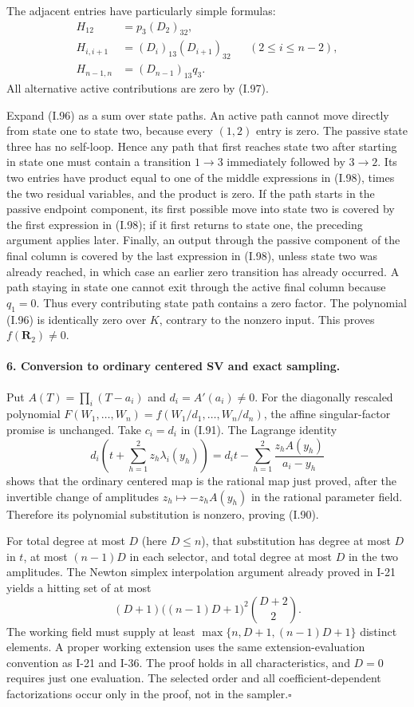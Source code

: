 The adjacent entries have particularly simple formulas:
\[
 \begin{aligned}
 H_{12}&=p_3(D_2)_{32},\\
 H_{i,i+1}&=(D_i)_{13}(D_{i+1})_{32}
                 &&(2\le i\le n-2),\\
 H_{n-1,n}&=(D_{n-1})_{13}q_3.
 \end{aligned}
 \tag{I.98}
\]
All alternative active contributions are zero by (I.97).

Expand (I.96) as a sum over state paths. An active path cannot
move directly from state one to state two, because every
$(1,2)$ entry is zero. The passive state three has no self-loop.
Hence any path that first reaches state two after starting in
state one must contain a transition $1\to3$ immediately
followed by $3\to2$. Its two entries have product equal to
one of the middle expressions in (I.98), times the two residual
variables, and the product is zero. If the path starts in the
passive endpoint component, its first possible move into state
two is covered by the first expression in (I.98); if it first
returns to state one, the preceding argument applies later.
Finally, an output through the passive component of the final
column is covered by the last expression in (I.98), unless
state two was already reached, in which case an earlier zero
transition has already occurred. A path staying in state one
cannot exit through the active final column because $q_1=0$.
Thus every contributing state path contains a zero factor.
The polynomial (I.96) is identically zero over $K$, contrary
to the nonzero input. This proves $f(\mathbf R_2)\ne0$.

\paragraph{6. Conversion to ordinary centered SV and exact sampling.}
Put $A(T)=\prod_i(T-a_i)$ and $d_i=A'(a_i)\ne0$. For the
diagonally rescaled polynomial
$F(W_1,\ldots,W_n)=f(W_1/d_1,\ldots,W_n/d_n)$, the affine
singular-factor promise is unchanged. Take $c_i=d_i$ in (I.91).
The Lagrange identity
\[
 d_i\left(t+\sum_{h=1}^{2}z_h\lambda_i(y_h)\right)
 =d_i t-\sum_{h=1}^{2}\frac{z_h A(y_h)}{a_i-y_h}
 \tag{I.99}
\]
shows that the ordinary centered map is the rational map just
proved, after the invertible change of amplitudes
$z_h\mapsto-z_hA(y_h)$ in the rational parameter field.
Therefore its polynomial substitution is nonzero, proving (I.90).

For total degree at most $D$ (here $D\le n$), that substitution
has degree at most $D$ in $t$, at most $(n-1)D$ in each selector,
and total degree at most $D$ in the two amplitudes. The Newton
simplex interpolation argument already proved in I-21 yields
a hitting set of at most
\[
 (D+1)\bigl((n-1)D+1\bigr)^2\binom{D+2}{2}.
 \tag{I.100}
\]
The working field must supply at least
$\max\{n,D+1,(n-1)D+1\}$ distinct elements. A proper working
extension uses the same extension-evaluation convention as
I-21 and I-36. The proof holds in all characteristics, and
$D=0$ requires just one evaluation. The selected order and
all coefficient-dependent factorizations occur only in the
proof, not in the sampler.\hfill$\square$


